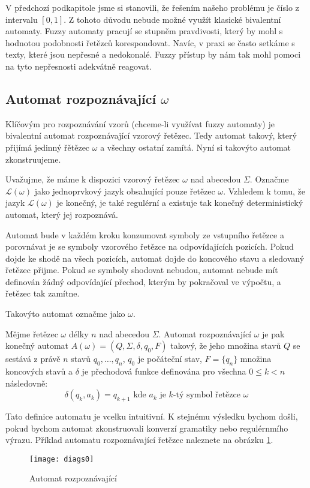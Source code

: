 \documentclass[a4paper,10pt]{article}
\begin{document}
V předchozí podkapitole jsme si stanovili, že řešením našeho problému je číslo z intervalu $[0,1]$. Z tohoto důvodu nebude možné využít klasické bivalentní automaty. Fuzzy automaty pracují se stupněm pravdivosti, který by mohl s hodnotou podobnosti řetězců korespondovat. Navíc, v praxi se často setkáme s texty, které jsou nepřesné a nedokonalé. Fuzzy přístup by nám tak mohl pomoci na tyto nepřesnosti adekvátně reagovat.

\subsection{Automat rozpoznávající $\omega$}
Klíčovým pro rozpoznávání vzorů (chceme-li využívat fuzzy automaty) je bivalentní automat rozpoznávající vzorový řetězec. Tedy automat takový, který přijímá jedinný řětězec $\omega$ a všechny ostatní zamítá. Nyní si takovýto automat zkonstruujeme.

Uvažujme, že máme k dispozici vzorový řetězec $\omega$ nad abecedou $\Sigma$. Označme $\mathcal{L}(\omega)$ jako jednoprvkový jazyk obsahující pouze řetězec $\omega$. Vzhledem k tomu, že jazyk $\mathcal{L}(\omega)$ je konečný, je také regulérní a existuje tak konečný deterministický automat, který jej rozpoznává.

Automat bude v každém kroku konzumovat symboly ze vstupního řetězce a porovnávat je se symboly vzorového řetězce na odpovídajících pozicích. Pokud dojde ke shodě na všech pozicích, automat dojde do koncového stavu a sledovaný řetězec přijme. Pokud se symboly shodovat nebudou, automat nebude mít definován žádný odpovídající přechod, kterým by pokračoval ve výpočtu, a řetězec tak zamítne. 

Takovýto automat označme jako  $\omega$.
\begin{definition}
  Mějme řetězec $\omega$ délky $n$ nad abecedou $\Sigma$. Automat rozpoznávající $\omega$ je pak konečný automat $A(\omega) = ( Q, \Sigma, \delta, q_0, F )$ takový, že jeho množina stavů $Q$ se sestává z právě $n$ stavů $q_0, \dots, q_n$, $q_0$ je počáteční stav, $F = \{ q_n \}$ množina koncových stavů a $\delta$ je přechodová funkce definována pro všechna $0 \leq k < n$ následovně:
  $$
    \delta(q_{k}, a_k) = q_{k+1} \text{ kde $a_k$ je $k$-tý symbol řetězce $\omega$}
  $$
\end{definition}

Tato definice automatu je vcelku intuitivní. K stejnému výsledku bychom došli, pokud bychom automat zkonstruovali konverzí gramatiky nebo regulérnmího výrazu. Příklad automatu rozpoznávající řetězec  naleznete na obrázku \ref{diag-AutRozpHell}.
\begin{figure}
 \texttt{[image: diags0]}
 \caption{Automat rozpoznávající } \label{diag-AutRozpHell}
\end{figure}
\end{document}
